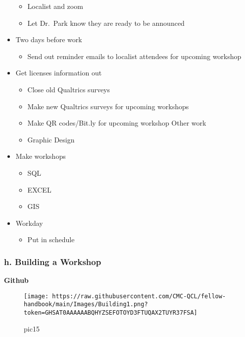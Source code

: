 \documentclass[
]{book}
\providecommand{\tightlist}{%
  \setlength{\itemsep}{0pt}\setlength{\parskip}{0pt}}
\begin{document}
\begin{itemize}
  \begin{itemize}
  \tightlist
  \item
    Localist and zoom
  \item
    Let Dr.~Park know they are ready to be announced
  \end{itemize}
\item
  Two days before work

  \begin{itemize}
  \tightlist
  \item
    Send out reminder emails to localist attendees for upcoming workshop
  \end{itemize}
\item
  Get licenses information out

  \begin{itemize}
  \tightlist
  \item
    Close old Qualtrics surveys
  \item
    Make new Qualtrics surveys for upcoming workshops
  \item
    Make QR codes/Bit.ly for upcoming workshop
    Other work
  \item
    Graphic Design
  \end{itemize}
\item
  Make workshops

  \begin{itemize}
  \tightlist
  \item
    SQL
  \item
    EXCEL
  \item
    GIS
  \end{itemize}
\item
  Workday

  \begin{itemize}
  \tightlist
  \item
    Put in schedule
  \end{itemize}
\end{itemize}

\hypertarget{h.-building-a-workshop}{%
\subsubsection{\texorpdfstring{h. Building a Workshop }{h. Building a Workshop }}\label{h.-building-a-workshop}}

\textbf{Github}

\begin{figure}
\centering
\texttt{[image: https://raw.githubusercontent.com/CMC-QCL/fellow-handbook/main/Images/Building1.png?token=GHSAT0AAAAAABQHYZSEFOTOYD3FTUQAX2TUYR37FSA]}
\caption{pic15}
\end{figure}
\end{document}
